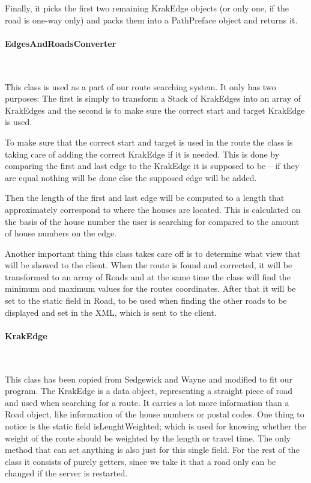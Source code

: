 \documentclass[a4paper,10pt,titlepage]{article}
\begin{document}
Finally, it picks the first two remaining KrakEdge objects (or only one, if the road is one-way only) and packs them into a PathPreface object and returns it.\
				
				\paragraph{EdgesAndRoadsConverter}\mbox{}\
				
This class is used as a part of our route searching system. It only has two purposes: The first is simply to transform a Stack of KrakEdges into an array of KrakEdges and the second is to make sure the correct start and target KrakEdge is used.

To make sure that the correct start and target is used in the route the class is taking care of adding the correct KrakEdge if it is needed. This is done by comparing the first and last edge to the KrakEdge it is supposed to be – if they are equal nothing will be done else the supposed edge will be added.

Then the length of the first and last edge will be computed to a length that approximately correspond to where the houses are located. This is calculated on the basis of the house number the user is searching for compared to the amount of house numbers on the edge.

Another important thing this class takes care off is to determine what view that will be showed to the client. When the route is found and corrected, it will be transformed to an array of Roads and at the same time the class will find the minimum and maximum values for the routes coordinates. After that it will be set to the static field in Road, to be used when finding the other roads to be displayed and set in the XML, which is sent to the client.

				\paragraph{KrakEdge \cite{sedgewickAndWayneDirectedEdge}}\mbox{}\
				

This class has been copied from Sedgewick and Wayne and modified to fit our program. The KrakEdge is a data object, representing a straight piece of road and used when searching for a route. It carries a lot more information than a Road object, like information of the house numbers or postal codes. One thing to notice is the static field isLenghtWeighted; which is used for knowing whether the weight of the route should be weighted by the length or travel time. The only method that can set anything is also just for this single field. For the rest of the class it consists of purely getters, since we take it that a road only can be changed if the server is restarted.
				
\end{document}
